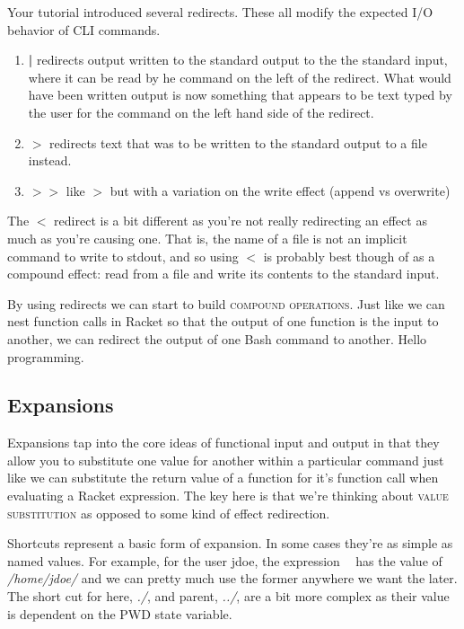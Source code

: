 \documentclass[]{tufte-handout}
\begin{document}
Your tutorial introduced several redirects. These all modify the expected I/O behavior of CLI commands. 
\begin{enumerate}
\item \textbf{|} redirects output written to the standard output to the the standard input, where it can be read by he command on the left of the redirect. What would have been written output is now something that appears to be text typed by the user for the command on the left hand side of the redirect. 
\newline
\item \textbf{$>$} redirects text that was to be written to the standard output to a file instead.
\item \textbf{$>>$} like \textit{$>$} but with a variation on the write effect (append vs overwrite)
\end{enumerate}
The \textbf{$<$} redirect is a bit different as you're not really redirecting an effect as much as you're causing one.  That is, the name of a file is not an implicit command to write to stdout, and so using $<$ is probably best though of as a compound effect: read from a file and write its contents to the standard input.

By using redirects we can start to build \textsc{compound operations}. Just like we can nest function calls in Racket so that the output of one function is the input to another, we can redirect the output of one Bash command to another. Hello programming.

\subsection{Expansions}

Expansions tap into the core ideas of functional input and output in that they allow you to substitute one value for another within a particular command just like we can substitute the return value of a function for it's function call when evaluating a Racket expression.  The key here is that we're thinking about \textsc{value substitution} as opposed to some kind of effect redirection. 

Shortcuts represent a basic form of expansion.  In some cases they're as simple as named values. For example, for the user jdoe, the expression \textbf{~} has the value of \textit{/home/jdoe/} and we can pretty much use the former anywhere we want the later. The short cut for here, \textit{./}, and parent, \textit{../}, are a bit more complex as their value is dependent on the PWD state variable. 
\end{document}
